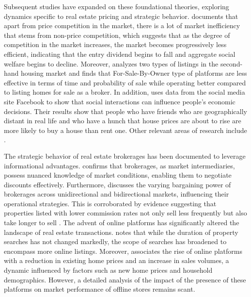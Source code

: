 \documentclass[11pt]{article}
\begin{document}
Subsequent studies have expanded on these foundational theories, exploring dynamics specific to real estate pricing and strategic behavior. \citet{550a6ccf-cde2-3dd1-979f-1a8db2b8ceb9} documents that apart from price competition in the market, there is a lot of market inefficiency that stems from non-price competition, which suggests that as the degree of competition in the market increases, the market becomes progressively less efficient, indicating that the entry dividend begins to fall and aggregate social welfare begins to decline. Moreover, \citet{hendel_relative_2009} analyzes two types of listings in the second-hand housing market and finds that For-Sale-By-Owner type of platforms are less effective in terms of time and probability of sale while operating better compared to listing homes for sale as a broker. In addition, \citet{bailey_economic_2018} uses data from the social media site Facebook to show that social interactions can influence people's economic decisions. Their results show that people who have friends who are geographically distant in real life and who have a hunch that house prices are about to rise are more likely to buy a house than rent one. Other relevant areas of research include \citep{SIRMANS1991207, NIEUWERBURGH_information, salz_intermediation_2022}.

The strategic behavior of real estate brokerages has been documented to leverage informational advantages. \citet{AGARWAL2019715} confirms that brokerages, as market intermediaries, possess nuanced knowledge of market conditions, enabling them to negotiate discounts effectively. Furthermore, \citet{HAN2015813} discusses the varying bargaining power of brokerages across unidirectional and bidirectional markets, influencing their operational strategies. This is corroborated by evidence suggesting that properties listed with lower commission rates not only sell less frequently but also take longer to sell \citep{10.1257/app.20160214}. The advent of online platforms has significantly altered the landscape of real estate transactions. \citet{ZUMPANO2003134} notes that while the duration of property searches has not changed markedly, the scope of searches has broadened to encompass more online listings. Moreover, \citet{ZHANG2021101104} associates the rise of online platforms with a reduction in existing home prices and an increase in sales volumes, a dynamic influenced by factors such as new home prices and household demographics. However, a detailed analysis of the impact of the presence of these platforms on market performance of offline stores remains scant.
\end{document}
